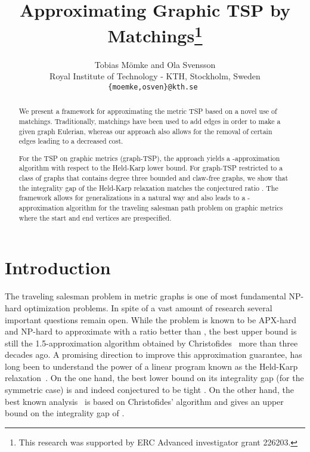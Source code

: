 \documentclass[letterpaper,11pt]{article}
\title{\vspace{-1cm}Approximating Graphic TSP by Matchings\thanks{This research
was supported by ERC Advanced investigator grant 226203.}}
\author{Tobias M\"{o}mke and Ola Svensson \\
 Royal Institute of Technology - KTH, Stockholm, Sweden \\
  {\tt \{moemke,osven\}@kth.se }}
\newcommand{\TSP}{graph-TSP\xspace}
\begin{document}
\maketitle

\begin{abstract}
  We present a framework for approximating the metric TSP based on a
  novel use of matchings. Traditionally, matchings have been used to
  add edges in order to make a given graph Eulerian, whereas our
  approach also allows for the removal of certain edges leading to a
  decreased cost.

  For the TSP on graphic metrics (\TSP), the approach yields a
  -approximation algorithm with respect to the
  Held-Karp lower bound. For \TSP restricted to a class of graphs that
  contains degree three bounded and claw-free graphs, we show that the
  integrality gap of the Held-Karp relaxation matches the conjectured
  ratio . The framework allows for generalizations in a natural way and
  also leads to a -approximation algorithm for the traveling
  salesman path problem on graphic metrics where the start and end vertices are
  prespecified.
\end{abstract}


\section{Introduction}\label{sec:intro}
    The traveling salesman problem in metric graphs is one of most
    fundamental NP-hard optimization problems. In spite of a vast amount
    of research several important questions remain open. While the problem
    is known to be APX-hard and NP-hard to approximate with a ratio better than
     \cite{PV06}, the best upper bound is still the
    1.5-approximation algorithm obtained by Christofides~\cite{Chr76}
    more than three decades ago.
    A promising direction to improve this approximation guarantee, has
    long been to understand the power of a linear program known as the
    Held-Karp relaxation~\cite{HK70}. On the one hand, the best lower
    bound on its integrality gap (for the symmetric case) is  and
    indeed conjectured to be tight \cite{Goe95}. On the other hand, the
    best known analysis~\cite{SW90, Wol80} is based on Christofides'
    algorithm and gives an upper bound on the integrality gap of .
\end{document}
